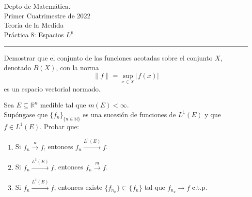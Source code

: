 \documentclass{book}
\newcommand{\rr}{\mathbb{R}}
\newcommand{\nn}{\mathbb{N}}
\begin{document}


\begin{large}
\begin{bfseries} %
        \noindent Depto de Matem\'atica.\\
        Primer Cuatrimestre de 2022\\                                                                                                                                                                                                                                                                                                                                                
        Teoría de la Medida \\
        Práctica 8: Espacios $L^p$

\end{bfseries}
\end{large}
\par\noindent\rule{\textwidth}{.5pt}








  \begin{ejer}{} Demostrar que el conjunto de las funciones acotadas sobre el conjunto $X$,
  denotado $B(X)$, con la norma 
  $$\parallel f \parallel=\sup_{x\in X}|f(x)| $$
  es un espacio vectorial normado.
	\end{ejer}




\begin{ejer}{} Sea $E\subseteq \rr^n$ medible tal que $m(E)<\infty$.
\\
Supóngase que $\{f_n\}_{ \{ n \in \nn\} }$ es una sucesión de funciones de $L^1(E)$
y que \linebreak $f\in L^1(E)$.
Probar que:
\begin{enumerate}
	\item Si $f_n \stackrel {u}{\longrightarrow}f$, entonces $f_n \stackrel {L^1(E)}{\longrightarrow}f$.
	\item Si $f_n \stackrel {L^1(E)}{\longrightarrow}f$, entonces $f_n \stackrel {m}{\longrightarrow}f$.
	\item Si $f_n \stackrel {L^1(E)}{\longrightarrow}f$, entonces existe $\{f_{n_k}\}\subseteq \{f_n\}$
	tal que  $f_{n_k}{\to}f$ c.t.p.
 \end{enumerate}
\end{ejer}
\end{document}
